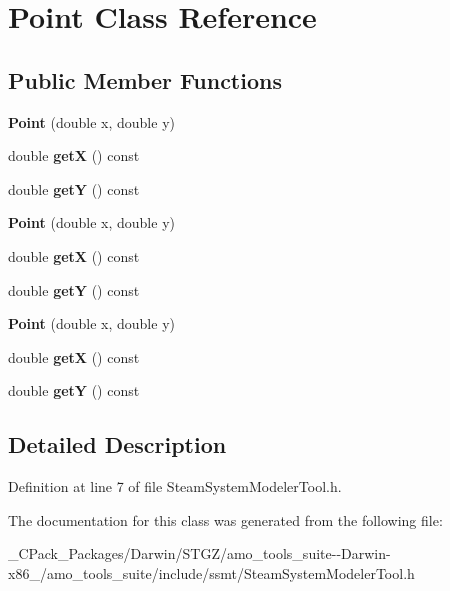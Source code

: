 \hypertarget{class_point}{}\section{Point Class Reference}
\label{class_point}
\subsection*{Public Member Functions}
\begin{DoxyCompactItemize}
\item 
\mbox{\label{class_point_a78b55e8d5466bb8c2cf60fa55f2562ff}} 
{\bfseries Point} (double x, double y)
\item 
\mbox{\label{class_point_a655794dd595a4821987664bf1d9010e8}} 
double {\bfseries getX} () const
\item 
\mbox{\label{class_point_aa323a12bec85e28ce6575dccec4f8b28}} 
double {\bfseries getY} () const
\item 
\mbox{\label{class_point_a78b55e8d5466bb8c2cf60fa55f2562ff}} 
{\bfseries Point} (double x, double y)
\item 
\mbox{\label{class_point_a655794dd595a4821987664bf1d9010e8}} 
double {\bfseries getX} () const
\item 
\mbox{\label{class_point_aa323a12bec85e28ce6575dccec4f8b28}} 
double {\bfseries getY} () const
\item 
\mbox{\label{class_point_a78b55e8d5466bb8c2cf60fa55f2562ff}} 
{\bfseries Point} (double x, double y)
\item 
\mbox{\label{class_point_a655794dd595a4821987664bf1d9010e8}} 
double {\bfseries getX} () const
\item 
\mbox{\label{class_point_aa323a12bec85e28ce6575dccec4f8b28}} 
double {\bfseries getY} () const
\end{DoxyCompactItemize}


\subsection{Detailed Description}


Definition at line 7 of file Steam\+System\+Modeler\+Tool.\+h.



The documentation for this class was generated from the following file\+:\begin{DoxyCompactItemize}
\item 
\+\_\+\+C\+Pack\+\_\+\+Packages/\+Darwin/\+S\+T\+G\+Z/amo\+\_\+tools\+\_\+suite-\/-\/\+Darwin-\/x86\+\_/amo\+\_\+tools\+\_\+suite/include/ssmt/Steam\+System\+Modeler\+Tool.\+h\end{DoxyCompactItemize}
